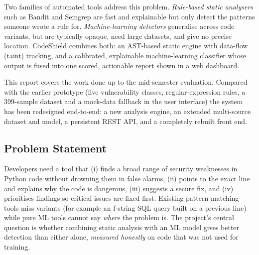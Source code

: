 \documentclass[11pt,a4paper,twoside]{report}
\begin{document}
Two families of automated tools address this problem. \emph{Rule-based static analysers} such as Bandit \cite{bandit} and Semgrep \cite{semgrep} are fast and explainable but only detect the patterns someone wrote a rule for. \emph{Machine-learning detectors} \cite{russell2018,fan2020} generalise across code variants, but are typically opaque, need large datasets, and give no precise location. CodeShield combines both: an AST-based static engine with data-flow (taint) tracking, and a calibrated, explainable machine-learning classifier whose output is fused into one scored, actionable report shown in a web dashboard.

This report covers the work done up to the mid-semester evaluation. Compared with the earlier prototype (five vulnerability classes, regular-expression rules, a 399-sample dataset and a mock-data fallback in the user interface) the system has been redesigned end-to-end: a new analysis engine, an extended multi-source dataset and model, a persistent REST API, and a completely rebuilt front end.

\subsection{Problem Statement}
Developers need a tool that (i) finds a broad range of security weaknesses in Python code without drowning them in false alarms, (ii) points to the exact line and explains why the code is dangerous, (iii) suggests a secure fix, and (iv) prioritises findings so critical issues are fixed first. Existing pattern-matching tools miss variants (for example an f-string SQL query built on a previous line) while pure ML tools cannot say \emph{where} the problem is. The project's central question is whether combining static analysis with an ML model gives better detection than either alone, \emph{measured honestly} on code that was not used for training.
\end{document}
